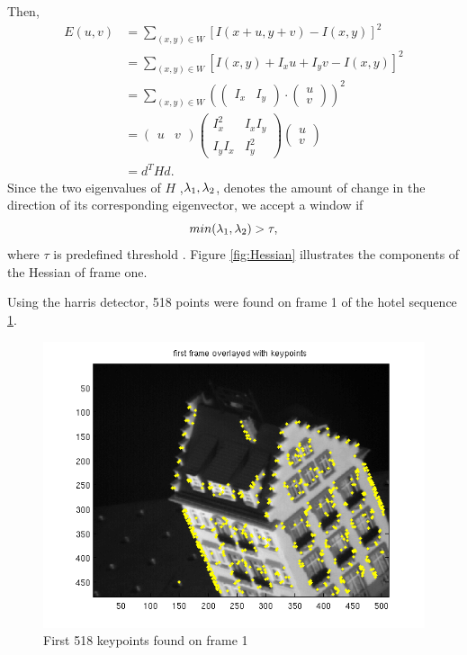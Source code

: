 Then, 
\begin{align*}
  E(u,v) &=\sum_{(x,y)\in W} [I(x+u, y+v) - I(x,y)]^2\\
&=\sum_{(x,y)\in W} [I(x,y) + I_xu +
I_yv - I(x,y)]^2\\
&= \sum_{(x,y)\in W} (
\begin{pmatrix}
  I_x & I_y
\end{pmatrix}
\cdot
\begin{pmatrix}
  u \\ v
\end{pmatrix}
)^2\\
&= \begin{pmatrix}
  u & v
\end{pmatrix} 
\begin{pmatrix}  I_x^2
  & I_xI_y \\ I_yI_x & I_y^2\end{pmatrix} \begin{pmatrix}
  u \\ v
\end{pmatrix}\\
&=d^T H d.
\end{align*}
  Since the two eigenvalues of $H$
,$\lambda_1, \lambda_2$, denotes the amount of change in the direction of its corresponding
eigenvector, we accept a window if $$min(\lambda_1, \lambda_2) > \tau,$$ where
$\tau$ is predefined threshold \cite{shi}. Figure \ref{fig:Hessian} illustrates
the components of the Hessian of frame one. 

Using the harris detector, 518 points were found on frame 1 of the hotel
sequence \ref{fig:keypoints}.
\begin{figure}[!ht]
  \begin{center}
  \includegraphics[scale=0.5]{keypoints.png}
  \caption{First 518 keypoints found on frame 1} 
  \label{fig:keypoints}
  \end{center}
\end{figure}

